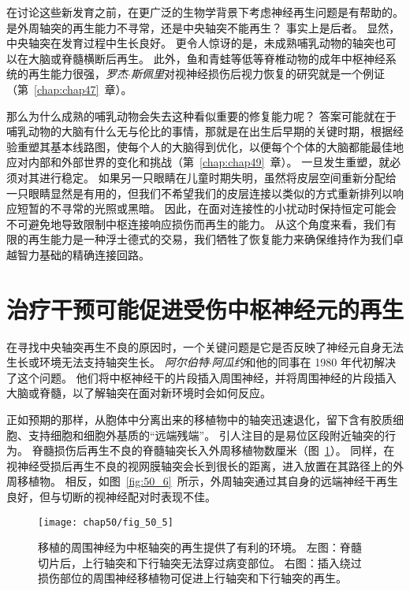在讨论这些新发育之前，在更广泛的生物学背景下考虑神经再生问题是有帮助的。
是外周轴突的再生能力不寻常，还是中央轴突不能再生？ 
事实上是后者。
显然，中央轴突在发育过程中生长良好。
更令人惊讶的是，未成熟哺乳动物的轴突也可以在大脑或脊髓横断后再生。
此外，鱼和青蛙等低等脊椎动物的成年中枢神经系统的再生能力很强，\textit{罗杰$\cdot$斯佩里}对视神经损伤后视力恢复的研究就是一个例证（第~\ref{chap:chap47}~章）。


那么为什么成熟的哺乳动物会失去这种看似重要的修复能力呢？
答案可能就在于哺乳动物的大脑有什么无与伦比的事情，那就是在出生后早期的关键时期，根据经验重塑其基本线路图，使每个人的大脑得到优化，以便每个个体的大脑都能最佳地应对内部和外部世界的变化和挑战（第~\ref{chap:chap49}~章）。
一旦发生重塑，就必须对其进行稳定。
如果另一只眼睛在儿童时期失明，虽然将皮层空间重新分配给一只眼睛显然是有用的，但我们不希望我们的皮层连接以类似的方式重新排列以响应短暂的不寻常的光照或黑暗。
因此，在面对连接性的小扰动时保持恒定可能会不可避免地导致限制中枢连接响应损伤而再生的能力。
从这个角度来看，我们有限的再生能力是一种浮士德式的交易，我们牺牲了恢复能力来确保维持作为我们卓越智力基础的精确连接回路。



\section{治疗干预可能促进受伤中枢神经元的再生}

在寻找中央轴突再生不良的原因时，一个关键问题是它是否反映了神经元自身无法生长或环境无法支持轴突生长。
\textit{阿尔伯特$\cdot$阿瓜约}和他的同事在 1980 年代初解决了这个问题。
他们将中枢神经干的片段插入周围神经，并将周围神经的片段插入大脑或脊髓，以了解轴突在面对新环境时会如何反应。


正如预期的那样，从胞体中分离出来的移植物中的轴突迅速退化，留下含有胶质细胞、支持细胞和细胞外基质的“远端残端”。
引人注目的是易位区段附近轴突的行为。
脊髓损伤后再生不良的脊髓轴突长入外周移植物数厘米（图~\ref{fig:50_5}）。
同样，在视神经受损后再生不良的视网膜轴突会长到很长的距离，进入放置在其路径上的外周移植物。
相反，如图~\ref{fig:50_6}~所示，外周轴突通过其自身的远端神经干再生良好，但与切断的视神经配对时表现不佳。


\begin{figure}[htbp]
	\centering
	\texttt{[image: chap50/fig\_50\_5]}
	\caption{移植的周围神经为中枢轴突的再生提供了有利的环境。
		左图：脊髓切片后，上行轴突和下行轴突无法穿过病变部位。
		右图：插入绕过损伤部位的周围神经移植物可促进上行轴突和下行轴突的再生\cite{david1981axonal}。}
	\label{fig:50_5}
\end{figure}


